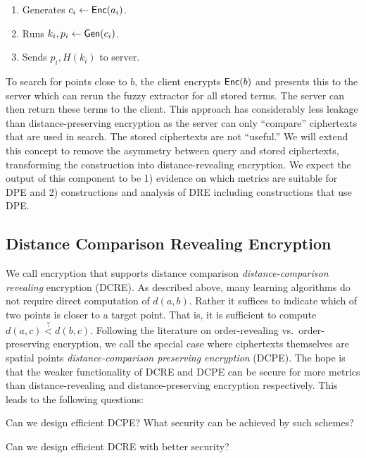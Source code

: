 \begin{enumerate}\setlength\itemsep{0em}
\item Generates $c_i \leftarrow \mathsf{Enc}(a_i)$.
\item Runs $k_i, p_i \leftarrow \mathsf{Gen}(c_i)$.
\item Sends $p_i, H(k_i)$ to server.
\end{enumerate}

To search for points close to $b$, the client encrypts $\mathsf{Enc}(b)$ and presents this to the server which can rerun the fuzzy extractor for all stored terms.  The server can then return these terms to the client.  This approach has considerably less leakage than distance-preserving encryption as the server can only ``compare'' ciphertexts that are used in search.  The stored ciphertexts are not ``useful.''  We will extend this concept to remove the asymmetry between query and stored ciphertexts, transforming the construction into distance-revealing encryption.
We expect the output of this component to be 1) evidence on which metrics are suitable for DPE  and 2) constructions and analysis of DRE including constructions that use DPE.  

\subsection{Distance Comparison Revealing Encryption}
We call encryption that supports distance comparison \emph{distance-comparison revealing} encryption (DCRE).  As described above, many learning algorithms do not require direct computation of $d(a,b)$.  Rather it suffices to indicate which of two points is closer to a target point.  That is, it is sufficient to compute $d(a,c)\overset{?}<d(b,c)$.  Following the literature on order-revealing vs.~order-preserving encryption, we call the special case where ciphertexts themselves are spatial points \emph{distance-comparison preserving encryption} (DCPE).  The hope is that the weaker functionality of DCRE and DCPE can be secure for more metrics than distance-revealing and distance-preserving encryption respectively.
This leads to the following questions:

\begin{question}
Can we design efficient DCPE?  What security can be achieved by such schemes?
\end{question}
\begin{question}
Can we design efficient DCRE with better security?
\end{question}

